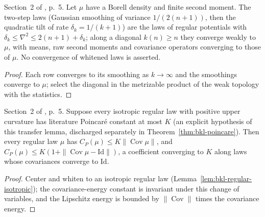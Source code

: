 \begin{lemma}
  \label{lem:bkl-regular-approximation}
  \leanok
  Section~2 of \cite{BizeulKlartagLehec2026}, p.~5. Let $\mu$ have a Borell density and finite
  second moment. The two-step laws (Gaussian smoothing of variance $1/(2(n+1))$, then the
  quadratic tilt of rate $\delta_k=1/(k+1)$) are the laws of regular potentials with
  $\delta_k\le\nabla^2\le2(n+1)+\delta_k$; along a diagonal $k(n)\ge n$ they converge weakly to
  $\mu$, with means, raw second moments and covariance operators converging to those of $\mu$.
  No convergence of whitened laws is asserted.
\end{lemma}
\begin{proof}
  \leanok
  Each row converges to its smoothing as $k\to\infty$ and the smoothings converge to $\mu$; select
  the diagonal in the metrizable product of the weak topology with the statistics.
\end{proof}

\begin{lemma}
  \label{lem:bkl-regular-poincare-transfer}
  \leanok
  Section~2 of \cite{BizeulKlartagLehec2026}, p.~5. Suppose every isotropic regular law with
  positive upper curvature has literature Poincaré constant at most $K$ (an explicit hypothesis
  of this transfer lemma, discharged separately in Theorem~\ref{thm:bkl-poincare}). Then every regular law $\mu$ has
  $C_P(\mu)\le K\|\operatorname{Cov}\mu\|$, and $C_P(\mu)\le K(1+\|\operatorname{Cov}\mu-\mathrm{Id}\|)$,
  a coefficient converging to $K$ along laws whose covariances converge to $\mathrm{Id}$.
\end{lemma}
\begin{proof}
  \leanok
  Center and whiten to an isotropic regular law (Lemma~\ref{lem:bkl-regular-isotropic}); the
  covariance-energy constant is invariant under this change of variables, and the Lipschitz
  energy is bounded by $\|\operatorname{Cov}\|$ times the covariance energy.
\end{proof}

